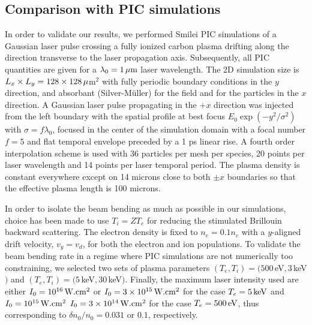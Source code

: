 \documentclass[%
 reprint,
 amsmath,amssymb,
 aps,
]{revtex4-1}
\begin{document}
\subsection{Comparison with PIC simulations}
In order to validate our results, we performed Smilei \cite[]{Smilei} PIC simulations  of a Gaussian laser pulse crossing a fully ionized carbon plasma drifting along the direction transverse to the laser propagation axis. 
Subsequently, all PIC quantities are given for a $\lambda_0=1\,\rm\mu m$ laser wavelength.
The 2D simulation size is $L_x \times L_y = 128 \times 128\, \rm \mu$m$^2$ with fully periodic boundary  conditions in the $y$ direction, and absorbant (Silver-M\"uller) for the field and for the particles in the $x$ direction.
A Gaussian laser pulse propagating in the $+x$ direction was injected from the left boundary with the spatial profile at best focus $E_0\exp(-y^2/\sigma^2)$ with $\sigma=f\lambda_0$, focused in the center of the simulation domain with a focal number $f = 5$ and flat temporal envelope preceded by a 1 ps linear rise. 
A fourth order interpolation scheme is used with 36 particles per mesh per species, 20 points per laser wavelength and 14 points per laser temporal period. The plasma density is constant everywhere except on 14 microns close to both $\pm x$ boundaries so that the effective plasma length is 100 microns.

In order to isolate the beam bending as much as possible in our simulations, choice has been made to use $T_i=ZT_e$ for reducing the stimulated Brillouin backward scattering. The electron density is fixed to $n_e =0.1n_c $ with a $y$-aligned drift velocity, $v_y=v_d$, for both the electron and ion populations.
To validate the beam bending rate in a regime where PIC simulations are not numerically too constraining, we selected two sets of plasma parameters $(T_e, T_i )= (500\, $eV$, 3\, $keV$)$ and $(T_e, T_i )= (5\, $keV$, 30 \,$keV$)$. Finally, the maximum laser intensity used are either $I_0 = 10^{16} \,\rm W.cm^2$ or $I_0 = 3 \times10^{15} \,\rm W.cm^2$ for the case  $T_e=5\, \rm keV$  and $I_0 = 10^{15} \,\rm W.cm^2$ $I_0 = 3 \times10^{14} \,\rm W.cm^2$ for the case $T_e=500\, \rm eV$, thus corresponding to $\delta n_0/n_0=0.031$ or $0.1$, respectively.
\end{document}

